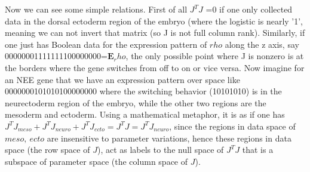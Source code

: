 Now we can see some simple relations. First of all $J^TJ$ =0 if one only collected data in the dorsal ectoderm region of the embryo (where the logistic is nearly '1', meaning we can not invert that matrix (so J is not full column rank).  Similarly, if one just has Boolean data for the expression pattern of $rho$ along the z axis, say 00000001111111100000000=$\bm{E}_rho$, the only possible point where J is nonzero is at the borders  where the gene switches from off to on or vice versa.  Now imagine for an NEE gene that we have an expression pattern over space like 0000000101010100000000 where the switching behavior (10101010) is in the neurectoderm region of the embryo, while the other two regions are the mesoderm and ectoderm.  Using a mathematical metaphor, it is as if one has $J^TJ_{meso} + J^TJ_{neuro} + J^TJ_{ecto} =J^TJ = J^TJ_{neuro}$, since the regions in data space of $meso, \ ecto$ are insensitive to parameter variations, hence these regions in data space (the row space of $J$), act as labels to the null space of $J^TJ$ that is a subspace of parameter space (the column space of $J$). 




